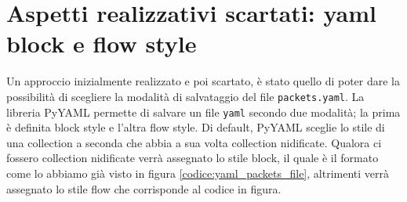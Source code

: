 \documentclass[binding=0.6cm]{sapthesis}
\begin{document}
 \section{Aspetti realizzativi scartati: yaml block e flow style}
 \label{sec:aspetti_realizzativi_scartati}
 Un approccio inizialmente realizzato e poi scartato, è stato quello di poter dare la possibilità di scegliere la modalità di salvataggio del file \texttt{packets.yaml}.
La libreria PyYAML permette di salvare un file \texttt{yaml} secondo due modalità; la prima è definita block style e l'altra flow style.
Di default, PyYAML sceglie lo stile di una collection a seconda che abbia a sua volta collection nidificate. Qualora ci fossero collection nidificate
verrà assegnato lo stile block, il quale è il formato come lo abbiamo già visto in figura \ref{codice:yaml_packets_file}, altrimenti verrà assegnato
lo stile flow che corrisponde al codice in figura.
\end{document}
